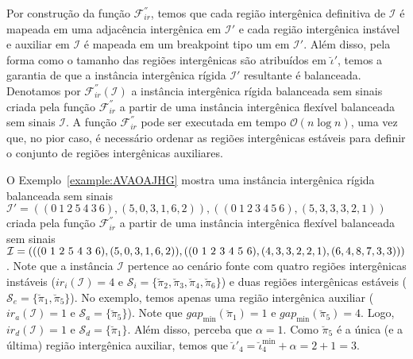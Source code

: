Por construção da função $\mathcal{F}_{ir}^{''}$, temos que cada região intergênica definitiva de $\mathcal{I}$ é mapeada em uma adjacência intergênica em $\mathcal{I}'$ e cada região intergênica instável e auxiliar em $\mathcal{I}$ é mapeada em um breakpoint tipo um em $\mathcal{I}'$. Além disso, pela forma como o tamanho das regiões intergênicas são atribuídos em $\breve\iota'$, temos a garantia de que a instância intergênica rígida $\mathcal{I}'$ resultante é balanceada. Denotamos por $\mathcal{F}_{ir}^{''}(\mathcal{I})$ a instância intergênica rígida balanceada sem sinais criada pela função $\mathcal{F}_{ir}^{''}$ a partir de uma instância intergênica flexível balanceada sem sinais $\mathcal{I}$. A função $\mathcal{F}_{ir}^{''}$ pode ser executada em tempo $\mathcal{O}(n\log n)$, uma vez que, no pior caso, é necessário ordenar as regiões intergênicas estáveis para definir o conjunto de regiões intergênicas auxiliares. 

\pagebreak

O Exemplo~\ref{example:AVAOAJHG} mostra uma instância intergênica rígida balanceada sem sinais $\mathcal{I}' = ((0~1~2~5~4~3~6),(5,0,3,1,6,2)),((0~1~2~3~4~5~6),(5,3,3,3,2,1))$ criada pela função $\mathcal{F}_{ir}^{''}$ a partir de uma instância intergênica flexível balanceada sem sinais $\mathcal{I} = (((0~1~2~5~4~3~6),(5,0,3,\break1,6,2)),((0~1~2~3~4~5~6),(4,3,3,2,2,1),(6,4,8,7,3,3)))$. Note que a instância $\mathcal{I}$ pertence ao cenário fonte com quatro regiões intergênicas instáveis ($ir_i(\mathcal{I}) = 4$ e $\mathcal{S}_{i}=\{\breve\pi_2,\breve\pi_3,\breve\pi_4,\breve\pi_6\}$) e duas regiões intergênicas estáveis ($\mathcal{S}_{e}=\{\breve\pi_1,\breve\pi_5\}$). No exemplo, temos apenas uma região intergênica auxiliar ($ir_a(\mathcal{I}) = 1$ e $\mathcal{S}_{a}=\{\breve\pi_5\}$). Note que $gap_{\min}(\breve\pi_1) = 1$ e $gap_{\min}(\breve\pi_5) = 4$. Logo, $ir_d(\mathcal{I}) = 1$ e $\mathcal{S}_{d}=\{\breve\pi_1\}$. Além disso, perceba que $\alpha = 1$. Como $\breve\pi_5$ é a única (e a última) região intergênica auxiliar, temos que $\breve\iota'_4 = \breve\iota^{\min}_4 +\alpha = 2 + 1 = 3$.



\pagebreak

